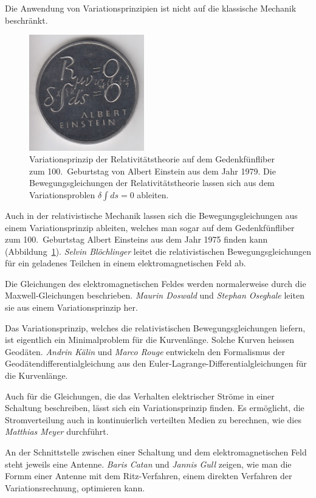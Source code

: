 Die Anwendung von Variationsprinzipien ist nicht auf die
klassische Mechanik beschränkt.
\begin{figure}
\centering
\includegraphics[width=5cm]{papers/Einstein5Fr.jpg}
\caption{Variationsprinzip der Relativitätstheorie auf dem
Gedenkfünfliber zum 100.~Geburtstag von Albert Einstein
aus dem Jahr 1979.
Die Bewegungsgleichungen der Relativitätstheorie lassen sich aus
dem Variationsproblen $\delta \int ds=0$ ableiten.
\label{buch:papers:fig:5liber}}
\end{figure}%
Auch in der relativistische Mechanik lassen sich die Bewegungsgleichungen
aus einem Variationsprinzip ableiten, welches man sogar auf
dem Gedenkfünfliber zum 100.~Geburtstag Albert Einsteins aus dem
Jahr 1975 finden kann (Abbildung~\ref{buch:papers:fig:5liber}).
\textit{Selvin Blöchlinger} leitet die relativistischen
Bewegungsgleichungen für ein geladenes Teilchen in einem
elektromagnetischen Feld ab.

Die Gleichungen des elektromagnetischen Feldes werden normalerweise
durch die Maxwell-Gleichungen beschrieben.
\textit{Maurin Doswald}
und
\textit{Stephan Oseghale}
leiten sie aus einem Variationsprinzip her.

Das Variationsprinzip, welches die relativistischen Bewegungsgleichungen
liefern, ist eigentlich ein Minimalproblem für die Kurvenlänge.
Solche Kurven heissen Geodäten.
\textit{Andrin Kälin}
und
\textit{Marco Rouge}
entwickeln den Formalismus der Geodätendifferentialgleichung aus
den Euler-Lagrange-Differentialgleichungen für die Kurvenlänge.

Auch für die Gleichungen, die das Verhalten elektrischer Ströme in 
einer Schaltung beschreiben, lässt sich ein Variationsprinzip 
finden.
Es ermöglicht, die Stromverteilung auch in kontinuierlich verteilten
Medien zu berechnen, wie dies \textit{Matthias Meyer} durchführt.

An der Schnittstelle zwischen einer Schaltung und dem elektromagnetischen
Feld steht jeweils eine Antenne.
\textit{Baris Catan}
und
\textit{Jannis Gull}
zeigen, wie man die Formm einer Antenne mit dem Ritz-Verfahren,
einem direkten Verfahren der Variationsrechnung,
optimieren kann.

